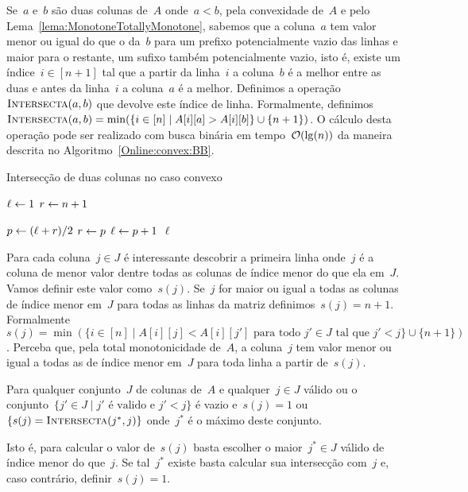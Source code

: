 Se~$a$ e~$b$ são duas colunas de~$A$ onde~$a < b$, pela convexidade de~$A$ e pelo Lema~\ref{lema:MonotoneTotallyMonotone}, sabemos que a coluna~$a$ tem valor menor ou igual do que o da~$b$ para um prefixo potencialmente vazio das linhas e maior para o restante, um sufixo também potencialmente vazio, isto é, existe um índice~$i \in [n+1]$ tal que a partir da linha~$i$ a coluna~$b$ é a melhor entre as duas e antes da linha~$i$ a coluna~$a$ é a melhor. Definimos a operação~$\textsc{Intersecta}(a,b)$ que devolve este índice de linha. Formalmente, definimos~${\textsc{Intersecta}(a,b) = \min(\{ i \in [n] \mid A[i][a] > A[i][b] \} \cup \{n+1\})}$. O cálculo desta operação pode ser realizado com busca binária em tempo~$\mathcal{O}(\lg(n))$ da maneira descrita no Algoritmo~\ref{Online:convex:BB}.

\begin{algorithm}[h]
\caption{Intersecção de duas colunas no caso convexo}
\label{Online:convex:BB}
\begin{algorithmic}[1]
    \State $\ell \leftarrow 1$
    \State $r \leftarrow n+1$

        \State $p \leftarrow (\ell + r)/2$
         \label{Online:convex:BB:ineq}
            \State $r \leftarrow p$
        \Else
            \State $\ell \leftarrow p+1$
        \EndIf
    \EndWhile
    \State \Return $\ell$
\EndFunction
\end{algorithmic}
\end{algorithm}

Para cada coluna~$j \in J$ é interessante descobrir a primeira linha onde~$j$ é a coluna de menor valor dentre todas as colunas de índice menor do que ela em~$J$. Vamos definir este valor como~$s(j)$. Se~$j$ for maior ou igual a todas as colunas de índice menor em~$J$ para todas as linhas da matriz definimos~$s(j) = n+1$. Formalmente~${ s(j) = \min(\{i \in [n] \mid A[i][j] < A[i][j'] \text{ para todo } j' \in J \text{ tal que } j' < j\} \cup \{n+1\}) }$. Perceba que, pela total monotonicidade de~$A$, a coluna~$j$ tem valor menor ou igual a todas as de índice menor em~$J$ para toda linha a partir de~$s(j)$.

\begin{prop} \label{Online:convex:easys}
Para qualquer conjunto~$J$ de colunas de~$A$ e qualquer~$j \in J$ válido ou o conjunto~${\{j' \in J \mid j' \text{ é valido e } j' < j\}}$ é vazio e~$s(j) = 1$ ou~$\{s(j) = \textsc{Intersecta}(j^*,j)\}$ onde~$j^*$ é o máximo deste conjunto.

Isto é, para calcular o valor de~$s(j)$ basta escolher o maior~$j^* \in J$ válido de índice menor do que~$j$. Se tal~$j^*$ existe basta calcular sua intersecção com~$j$ e, caso contrário, definir~$s(j) = 1$.
\end{prop}

